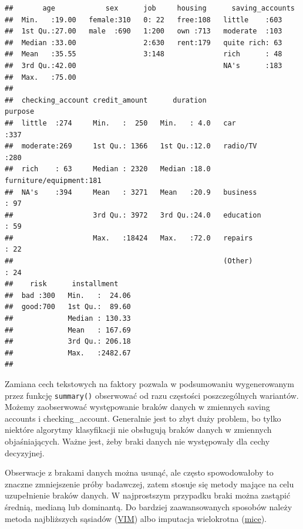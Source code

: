 \documentclass[
]{book}
\begin{document}
\begin{verbatim}
##       age            sex      job     housing      saving_accounts
##  Min.   :19.00   female:310   0: 22   free:108   little    :603   
##  1st Qu.:27.00   male  :690   1:200   own :713   moderate  :103   
##  Median :33.00                2:630   rent:179   quite rich: 63   
##  Mean   :35.55                3:148              rich      : 48   
##  3rd Qu.:42.00                                   NA's      :183   
##  Max.   :75.00                                                    
##                                                                   
##  checking_account credit_amount      duration                   purpose   
##  little  :274     Min.   :  250   Min.   : 4.0   car                :337  
##  moderate:269     1st Qu.: 1366   1st Qu.:12.0   radio/TV           :280  
##  rich    : 63     Median : 2320   Median :18.0   furniture/equipment:181  
##  NA's    :394     Mean   : 3271   Mean   :20.9   business           : 97  
##                   3rd Qu.: 3972   3rd Qu.:24.0   education          : 59  
##                   Max.   :18424   Max.   :72.0   repairs            : 22  
##                                                  (Other)            : 24  
##    risk      installment     
##  bad :300   Min.   :  24.06  
##  good:700   1st Qu.:  89.60  
##             Median : 130.33  
##             Mean   : 167.69  
##             3rd Qu.: 206.18  
##             Max.   :2482.67  
## 
\end{verbatim}

Zamiana cech tekstowych na faktory pozwala w podsumowaniu wygenerowanym przez funkcję \texttt{summary()} obserwować od razu częstości poszczególnych wariantów. Możemy zaobserwować występowanie braków danych w zmiennych saving accounts i checking\_account. Generalnie jest to zbyt duży problem, bo tylko niektóre algorytmy klasyfikacji nie obsługują braków danych w zmiennych objaśniających. Ważne jest, żeby braki danych nie występowały dla cechy decyzyjnej.

Obserwacje z brakami danych można usunąć, ale często spowodowałoby to znaczne zmniejszenie próby badawczej, zatem stosuje się metody mające na celu uzupełnienie braków danych. W najprostszym przypadku braki można zastąpić średnią, medianą lub dominantą. Do bardziej zaawansowanych sposobów należy metoda najbliższych sąsiadów (\href{https://cran.r-project.org/web/packages/VIM/index.html}{VIM}) albo imputacja wielokrotna (\href{https://cran.r-project.org/web/packages/mice/index.html}{mice}).
\end{document}
